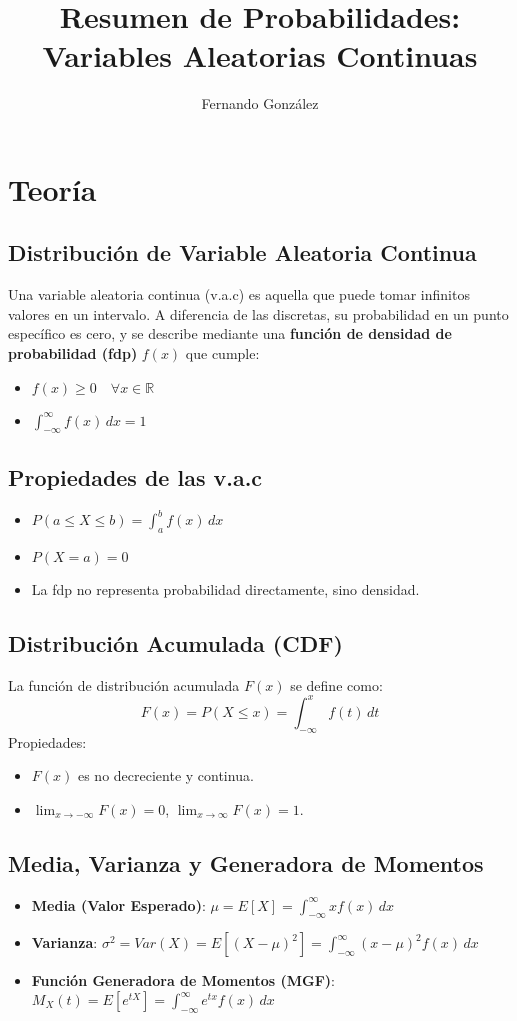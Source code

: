 \documentclass[letterpaper]{article}
\title{Resumen de Probabilidades: Variables Aleatorias Continuas}
\author{Fernando González}
\begin{document}
	
	\maketitle
	
	\section{Teoría}
	
	\subsection{Distribución de Variable Aleatoria Continua}
	Una variable aleatoria continua (v.a.c) es aquella que puede tomar infinitos valores en un intervalo. A diferencia de las discretas, su probabilidad en un punto específico es cero, y se describe mediante una \textbf{función de densidad de probabilidad (fdp)} $f(x)$ que cumple:
	\begin{itemize}
		\item $f(x) \geq 0 \quad \forall x \in \mathbb{R}$
		\item $\int_{-\infty}^{\infty} f(x) \, dx = 1$
	\end{itemize}
	
	\subsection{Propiedades de las v.a.c}
	\begin{itemize}
		\item $P(a \leq X \leq b) = \int_{a}^{b} f(x) \, dx$
		\item $P(X = a) = 0$
		\item La fdp no representa probabilidad directamente, sino densidad.
	\end{itemize}
	
	\subsection{Distribución Acumulada (CDF)}
	La función de distribución acumulada $F(x)$ se define como:
	\[ F(x) = P(X \leq x) = \int_{-\infty}^{x} f(t) \, dt \]
	Propiedades:
	\begin{itemize}
		\item $F(x)$ es no decreciente y continua.
		\item $\lim_{x \to -\infty} F(x) = 0$, $\lim_{x \to \infty} F(x) = 1$.
	\end{itemize}
	
	\subsection{Media, Varianza y Generadora de Momentos}
	\begin{itemize}
		\item \textbf{Media (Valor Esperado)}: $\mu = E[X] = \int_{-\infty}^{\infty} x f(x) \, dx$
		\item \textbf{Varianza}: $\sigma^2 = Var(X) = E[(X - \mu)^2] = \int_{-\infty}^{\infty} (x - \mu)^2 f(x) \, dx$
		\item \textbf{Función Generadora de Momentos (MGF)}: $M_X(t) = E[e^{tX}] = \int_{-\infty}^{\infty} e^{tx} f(x) \, dx$
	\end{itemize}
	
\end{document}
